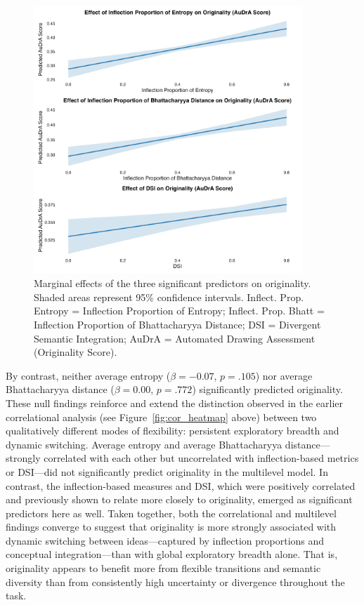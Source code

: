 \documentclass[../MA_Thesis.tex]{subfiles}
\begin{document}
\begin{figure}[H]
  \centering
  \includegraphics[height=0.85\textheight, width=0.9\textwidth]{../analysis/results/main_results/multilevel_regression/marginal_effects_plot.png}
  \caption{Marginal effects of the three significant predictors on originality. Shaded areas represent 95\% confidence intervals. Inflect. Prop. Entropy = Inflection Proportion of Entropy; Inflect. Prop. Bhatt = Inflection Proportion of Bhattacharyya Distance; DSI = Divergent Semantic Integration; AuDrA = Automated Drawing Assessment (Originality Score).}
  \label{fig:marginal_plot}
\end{figure}

By contrast, neither average entropy ($\beta = -0.07$, $p = .105$) nor average Bhattacharyya distance ($\beta = 0.00$, $p = .772$) significantly predicted originality. These null findings reinforce and extend the distinction observed in the earlier correlational analysis (see Figure~\ref{fig:cor_heatmap} above) between two qualitatively different modes of flexibility: persistent exploratory breadth and dynamic switching. Average entropy and average Bhattacharyya distance—strongly correlated with each other but uncorrelated with inflection-based metrics or DSI—did not significantly predict originality in the multilevel model. In contrast, the inflection-based measures and DSI, which were positively correlated and previously shown to relate more closely to originality, emerged as significant predictors here as well. Taken together, both the correlational and multilevel findings converge to suggest that originality is more strongly associated with dynamic switching between ideas—captured by inflection proportions and conceptual integration—than with global exploratory breadth alone. That is, originality appears to benefit more from flexible transitions and semantic diversity than from consistently high uncertainty or divergence throughout the task.
\end{document}
